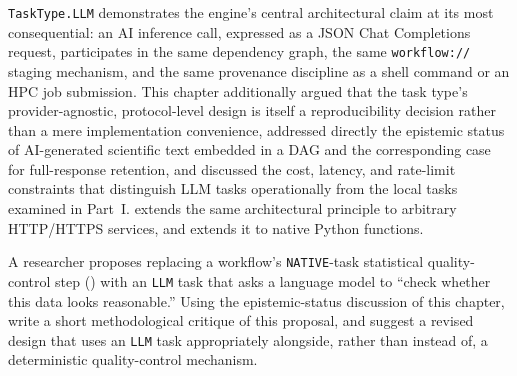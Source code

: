 \texttt{TaskType.LLM} demonstrates the engine's central architectural claim
at its most consequential: an AI inference call, expressed as a JSON Chat
Completions request, participates in the same dependency graph, the same
\texttt{workflow://} staging mechanism, and the same provenance discipline as
a shell command or an HPC job submission. This chapter additionally argued
that the task type's provider-agnostic, protocol-level design is itself a
reproducibility decision rather than a mere implementation convenience,
addressed directly the epistemic status of AI-generated scientific text
embedded in a DAG and the corresponding case for full-response retention,
and discussed the cost, latency, and rate-limit constraints that distinguish
LLM tasks operationally from the local tasks examined in Part~I.
 extends the same architectural principle to arbitrary
HTTP/HTTPS services, and  extends it to native Python
functions.

\begin{exercise}
A researcher proposes replacing a workflow's \texttt{NATIVE}-task
statistical quality-control step () with an
\texttt{LLM} task that asks a language model to ``check whether this data
looks reasonable.'' Using the epistemic-status discussion of this chapter,
write a short methodological critique of this proposal, and suggest a
revised design that uses an \texttt{LLM} task appropriately alongside,
rather than instead of, a deterministic quality-control mechanism.
\end{exercise}
